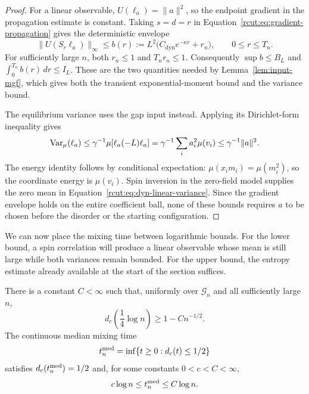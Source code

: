 \begin{proof}
For a linear observable, $U(\ell_a)=\|a\|^2$, so the endpoint gradient
in the propagation estimate is constant.  Taking $s=d=r$ in
Equation~\eqref{rcut:eq:gradient-propagation} gives the deterministic
envelope
\[
 \|U(S_r\ell_a)\|_\infty
 \le b(r):=L^2\bigl(C_{\mathrm{dyn}}e^{-\kappa r}+r_n\bigr),
 \qquad 0\le r\le T_n.
\]
For sufficiently large $n$, both $r_n\le1$ and $T_nr_n\le1$.
Consequently $\sup b\le B_L$ and $\int_0^{T_n}b(r)\,dr\le I_L$.
These are the two quantities needed by Lemma~\ref{lem:input-mgf}, which
gives both the transient exponential-moment bound and the variance bound.

The equilibrium variance uses the gap input instead.  Applying its
Dirichlet-form inequality gives
\[
 \operatorname{Var}_\mu(\ell_a)
 \le\gamma^{-1}\mu\!\left[\ell_a(-L)\ell_a\right]
 =\gamma^{-1}\sum_i a_i^2\mu(v_i)
 \le\gamma^{-1}\|a\|^2.
\]
The energy identity follows by conditional expectation:
$\mu(x_i m_i)=\mu(m_i^2)$, so the coordinate energy is $\mu(v_i)$.
Spin inversion in the zero-field model supplies the zero mean in
Equation~\eqref{rcut:eq:dyn-linear-variance}.  Since the gradient envelope
holds on the entire coefficient ball, none of these bounds requires
$a$ to be chosen before the disorder or the starting configuration.
\end{proof}

We can now place the mixing time between logarithmic bounds.  For the
lower bound, a spin correlation will produce a linear observable whose
mean is still large while both variances remain bounded.  For the upper
bound, the entropy estimate already available at the start of the
section suffices.

\begin{proposition}
\label{rcut:prop:mixing-scale}
There is a constant $C<\infty$ such that, uniformly over
$\mathcal G_n$ and all sufficiently large $n$,
\begin{equation}
 d_c\!\left(\frac14\log n\right)
 \ge1-Cn^{-1/2}.
 \label{rcut:eq:dyn-strong-lower}
\end{equation}
The continuous median mixing time
\[
 t_n^{\rm med}=\inf\{t\ge0:d_c(t)\le1/2\}
\]
satisfies $d_c(t_n^{\rm med})=1/2$ and, for some constants $0<c<C<\infty$,
\begin{equation}
 c\log n\le t_n^{\rm med}\le C\log n.
 \label{rcut:eq:dyn-median-scale}
\end{equation}
\end{proposition}

